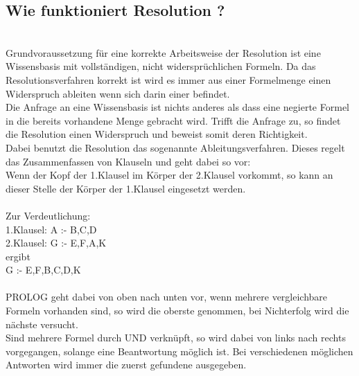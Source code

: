 \subsection{Wie funktioniert Resolution ?}\qquad\\
Grundvoraussetzung für eine korrekte Arbeitsweise der Resolution ist eine Wissensbasis mit vollständigen, nicht widersprüchlichen Formeln. Da das Resolutionsverfahren korrekt ist wird es immer aus einer Formelmenge einen Widerspruch ableiten wenn sich darin einer befindet.\\
Die Anfrage an eine Wissensbasis ist nichts anderes als dass eine negierte Formel in die bereits vorhandene Menge gebracht wird. Trifft die Anfrage zu, so findet die Resolution einen Widerspruch und beweist somit deren Richtigkeit.\\
Dabei benutzt die Resolution das sogenannte Ableitungsverfahren. Dieses regelt das Zusammenfassen von Klauseln und geht dabei so vor:\\
Wenn der Kopf der 1.Klausel im Körper der 2.Klausel vorkommt, so kann an dieser Stelle der Körper der 1.Klausel eingesetzt werden.\\
\qquad\\
Zur Verdeutlichung:\\
1.Klausel: A :- B,C,D\\
2.Klausel: G :- E,F,A,K\\
ergibt\\
G :- E,F,B,C,D,K\\
\qquad\\
PROLOG geht dabei von oben nach unten vor, wenn mehrere vergleichbare Formeln vorhanden sind, so wird die \grqq oberste\grqq{} genommen, bei Nichterfolg wird die nächste versucht.\\
Sind mehrere Formel durch UND verknüpft, so wird dabei von links nach rechts vorgegangen, solange eine Beantwortung möglich ist. Bei verschiedenen möglichen Antworten wird immer die zuerst gefundene ausgegeben.

